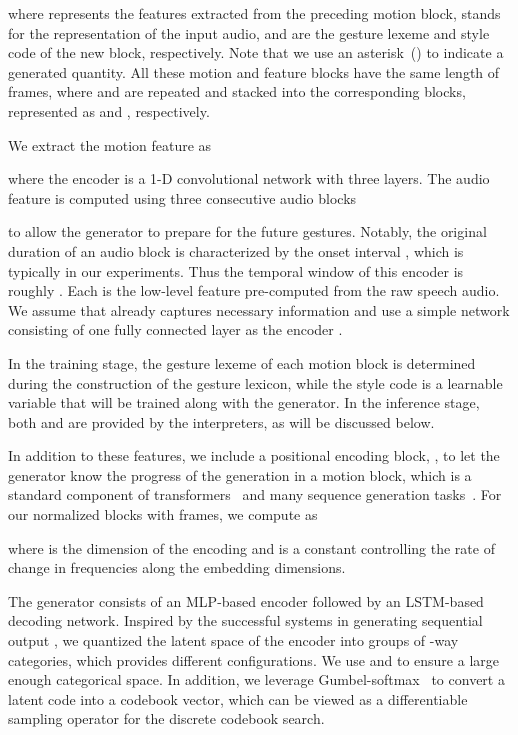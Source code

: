 \documentclass[acmtog,authorversion]{acmart}
\begin{document}
where  represents the features extracted from the preceding motion block,  stands for the representation of the input audio,  and  are the gesture lexeme and style code of the new block, respectively. Note that we use an asterisk~() to indicate a generated quantity. All these motion and feature blocks have the same length of  frames, where  and  are repeated and stacked into the corresponding blocks, represented as  and , respectively.

We extract the motion feature  as 

where the encoder  is a 1-D convolutional network with three layers.
The audio feature  is computed using three consecutive audio blocks

to allow the generator to prepare for the future gestures. 
Notably, the original duration of an audio block is characterized by the onset interval , which is typically  in our experiments. Thus the temporal window of this encoder is roughly .
Each  is the low-level feature pre-computed from the raw speech audio. We assume that  already captures necessary information and use a simple network consisting of one fully connected layer as the encoder .

In the training stage, the gesture lexeme  of each motion block is determined during the construction of the gesture lexicon, while the style code  is a learnable variable that will be trained along with the generator. In the inference stage, both  and  are provided by the interpreters, as will be discussed below.

In addition to these features, we include a positional encoding block, , to let the generator know the progress of the generation in a motion block, which is a standard component of transformers~\cite{Vaswani2017_Attentiona} and many sequence generation tasks~\cite{Harvey2020_motionInBetween}. For our normalized blocks with  frames, we compute  as

where  is the dimension of the encoding and  is a constant controlling the rate of change in frequencies along the embedding dimensions.

The generator  consists of an MLP-based encoder followed by an LSTM-based decoding network. Inspired by the successful systems in generating sequential output \cite{richard2021meshtalk,oord2017neural}, we quantized the latent space of the encoder into  groups of -way categories, which provides  different configurations. We use  and  to ensure a large enough categorical space. In addition, we leverage Gumbel-softmax~\cite{jang2017categorical} to convert a latent code into a codebook vector, which can be viewed as a differentiable sampling operator for the discrete codebook search.
\end{document}

